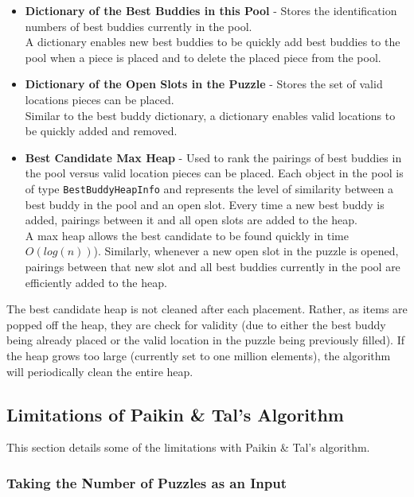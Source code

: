 \documentclass{report}
\begin{document}
\begin{itemize}

	\item \textbf{Dictionary of the Best Buddies in this Pool} - Stores the identification numbers of best buddies currently in the pool.  \\ A dictionary enables new best buddies to be quickly add best buddies to the pool when a piece is placed and to delete the placed piece from the pool.
	
	\item \textbf{Dictionary of the Open Slots in the Puzzle} - Stores the set of valid locations pieces can be placed.  \\ Similar to the best buddy dictionary, a dictionary enables valid locations to be quickly added and removed.

	\item \textbf{Best Candidate Max Heap} - Used to rank the pairings of best buddies in the pool versus valid location pieces can be placed.  Each object in the pool is of type \texttt{BestBuddyHeapInfo} and represents the level of similarity between a best buddy in the pool and an open slot.  Every time a new best buddy is added, pairings between it and all open slots are added to the heap.  \\ A max heap allows the best candidate to be found quickly in time $O(log(n))$).  Similarly, whenever a new open slot in the puzzle is opened, pairings between that new slot and all best buddies currently in the pool are efficiently added to the heap.  

\end{itemize}

The best candidate heap is not cleaned after each placement.  Rather, as items are popped off the heap, they are check for validity (due to either the best buddy being already placed or the valid location in the puzzle being previously filled). If the heap grows too large (currently set to one million elements), the algorithm will periodically clean the entire heap.

\subsection{Limitations of Paikin \& Tal's Algorithm}\label{sec:paikinTalLimitations}

This section details some of the limitations with Paikin \& Tal's algorithm.  

\subsubsection{Taking the Number of Puzzles as an Input}\label{sec:limitationNumberPuzzles}
\end{document}
